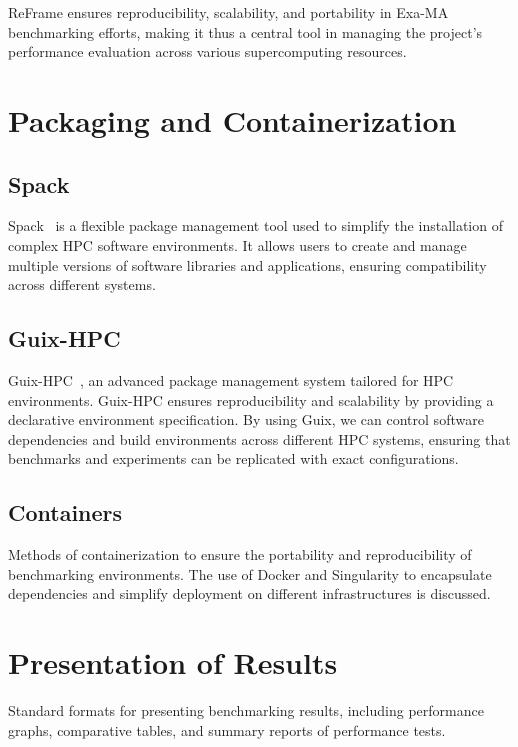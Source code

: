 ReFrame ensures reproducibility, scalability, and portability in Exa-MA benchmarking efforts, making it thus a central tool in managing the project’s performance evaluation across various supercomputing resources.


\section{Packaging and Containerization}
\label{sec:methodology-packaging}

\subsection{Spack}
\label{sec:methodology-packaging-spack}

Spack~\cite{gamblin_spack_2015} is a flexible package management tool used to simplify the installation of complex HPC software environments. It allows users to create and manage multiple versions of software libraries and applications, ensuring compatibility across different systems.

\subsection{Guix-HPC}
\label{sec:methodology-packaging-guix-hpc}

Guix-HPC~\cite{vallet_toward_2022}, an advanced package management system tailored for HPC environments. Guix-HPC ensures reproducibility and scalability by providing a declarative environment specification. By using Guix, we can control software dependencies and build environments across different HPC systems, ensuring that benchmarks and experiments can be replicated with exact configurations.


\subsection{Containers}
\label{sec:methodology-packaging-container}

Methods of containerization to ensure the portability and reproducibility of benchmarking environments.
The use of Docker and Singularity to encapsulate dependencies and simplify deployment on different infrastructures is discussed.

\section{Presentation of Results}
\label{sec:methodology-presentation}
Standard formats for presenting benchmarking results, including performance graphs, comparative tables, and summary reports of performance tests.

